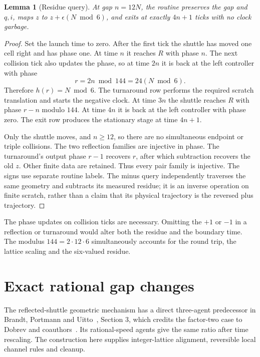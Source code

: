 \documentclass[11pt,letterpaper]{article}
\numberwithin{equation}{section}
\newtheorem{lemma}[theorem]{Lemma}
\theoremstyle{definition}
\theoremstyle{remark}
\begin{document}
\begin{lemma}[Residue query]\label{smc:tm:lem:query}
At gap $n=12N$, the routine preserves the gap and $q,i$, maps $z$ to $z+\epsilon(N\bmod6)$, and exits at exactly $4n+1$ ticks with no clock garbage.
\end{lemma}
\begin{proof}
Set the launch time to zero. After the first tick the shuttle has moved one cell right and has phase one. At time $n$ it reaches $R$ with phase $n$. The next collision tick also updates the phase, so at time $2n$ it is back at the left controller with phase
\[
r=2n\bmod144=24(N\bmod6).
\]
Therefore $h(r)=N\bmod6$. The turnaround row performs the required scratch translation and starts the negative clock. At time $3n$ the shuttle reaches $R$ with phase $r-n$ modulo $144$. At time $4n$ it is back at the left controller with phase zero. The exit row produces the stationary stage at time $4n+1$.

Only the shuttle moves, and $n\ge12$, so there are no simultaneous endpoint or triple collisions. The two reflection families are injective in phase. The turnaround's output phase $r-1$ recovers $r$, after which subtraction recovers the old $z$. Other finite data are retained. Thus every pair family is injective. The signs use separate routine labels. The minus query independently traverses the same geometry and subtracts its measured residue; it is an inverse operation on finite scratch, rather than a claim that its physical trajectory is the reversed plus trajectory.
\end{proof}

The phase updates on collision ticks are necessary. Omitting the $+1$ or $-1$ in a reflection or turnaround would alter both the residue and the boundary time. The modulus $144=2\cdot12\cdot6$ simultaneously accounts for the round trip, the lattice scaling and the six-valued residue.

\section{Exact rational gap changes}\label{smc:tm:sec:arithmetic}

The reflected-shuttle geometric mechanism has a direct three-agent predecessor in Brandt, Portmann and Uitto~\cite{brandt2020}, Section 3, which credits the factor-two case to Dobrev and coauthors~\cite{dobrev2019}. Its rational-speed agents give the same ratio after time rescaling. The construction here supplies integer-lattice alignment, reversible local channel rules and cleanup.
\end{document}
